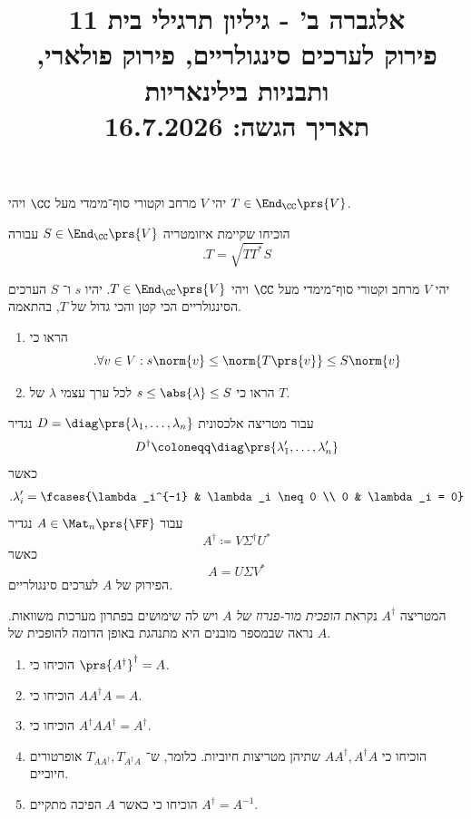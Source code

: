 \documentclass[a4paper,10pt,twoside,openany]{article}
\title{
אלגברה ב' - גיליון תרגילי בית 11 \\
פירוק לערכים סינגולריים, פירוק פולארי, ותבניות בילינאריות
\\
\vspace{1cm}
\large{תאריך הגשה: 16.7.2026}
}
\date{}
\begin{document}
\maketitle

\begin{exercise}
יהי
$V$
מרחב וקטורי סוף־מימדי מעל
$\CC$
ויהי
$T \in \End_\CC\prs{V}$.

הוכיחו שקיימת איזומטריה
$S \in \End_\CC\prs{V}$
עבורה
\[\text{.} T = \sqrt{T T^*} S\]
\end{exercise}

\begin{exercise}
יהי
$V$
מרחב וקטורי סוף־מימדי מעל
$\CC$
ויהי
$T \in \End_\CC\prs{V}$.
יהיו
$s$
ו־%
$S$
הערכים הסינגולריים הכי קטן והכי גדול של
$T$,
בהתאמה.
\begin{enumerate}
\item הראו כי
\[\text{.} \forall v \in V: s \norm{v} \leq \norm{T\prs{v}} \leq S \norm{v}\]
\item הראו כי
$s \leq \abs{\lambda} \leq S$
לכל ערך עצמי
$\lambda$
של
$T$.
\end{enumerate}
\end{exercise}

\begin{exercise}
עבור מטריצה אלכסונית
$D = \diag\prs{\lambda_1, \ldots, \lambda_n}$
נגדיר
\begin{align*}
D^\dagger \coloneqq \diag\prs{\lambda_1', \ldots, \lambda_n'}
\end{align*}
כאשר
\begin{align*}
\text{.} \lambda_i' = \fcases{\lambda_i^{-1} & \lambda_i \neq 0 \\ 0 & \lambda_i = 0}
\end{align*}
עבור
$A \in \Mat_n\prs{\FF}$
נגדיר
\[A^\dagger \coloneqq V \Sigma^\dagger U^*\]
כאשר
\[A = U \Sigma V^*\]
הפירוק של
$A$
לערכים סינגולריים.

המטריצה
$A^\dagger$
נקראת
\emph{הופכית מור-פנרוז של
$A$}
ויש לה שימושים בפתרון מערכות משוואות. נראה שבמספר מובנים היא מתנהגת באופן הדומה להופכית של
$A$.

\begin{enumerate}
\item הוכיחו כי
$\prs{A^\dagger}^\dagger = A$.

\item הוכיחו כי
$A A^\dagger A = A$.

\item הוכיחו כי
$A^\dagger A A^\dagger = A^\dagger$.

\item הוכיחו כי
$A A^\dagger, A^\dagger A$
שתיהן מטריצות חיוביות. כלומר, ש־%
$T_{A A^\dagger}, T_{A^\dagger A}$
אופרטורים חיוביים.

\item הוכיחו כי כאשר
$A$
הפיכה מתקיים
$A^\dagger = A^{-1}$.
\end{enumerate}
\end{exercise}
\end{document}
